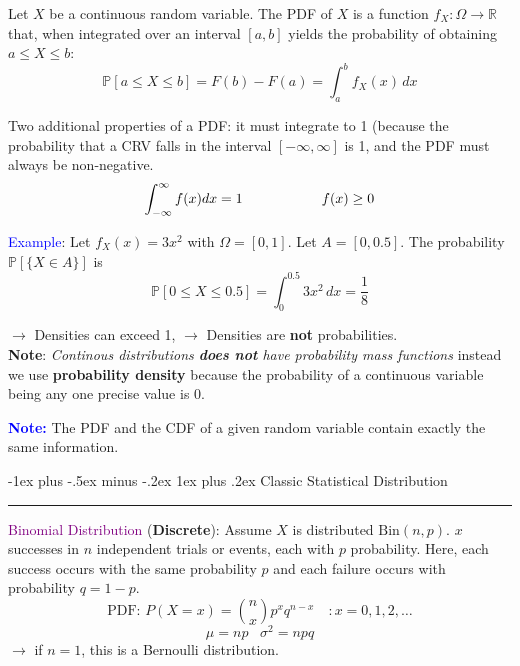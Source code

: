 \documentclass[letterpaper, 10.5pt,landscape]{article}
\makeatletter
\renewcommand{\subsubsection}{\@startsection{subsubsection}{3}{0mm}%
                                {-1ex plus -.5ex minus -.2ex}%
                                {1ex plus .2ex}%
                                {\normalfont\small\bfseries}}
\makeatother
\begin{document}
\begin{multicols*}{3}
   
Let $X$ be a continuous random variable. The  PDF of $X$ is a function \(f_{X}: \Omega \rightarrow \mathbb{R}\) that, when integrated over an interval $[a,b]$ yields the probability of obtaining $a \leq X \leq b:$
\[\boxed{\mathbb{P}[a\leq X \leq b] = F(b) - F(a) = \int_{a}^{b} f_{X}(x) \hspace{2pt} dx} \]



Two additional properties of a PDF:  it must integrate to 1 (because the probability that a CRV falls in the interval $[-\infty, \infty]$ is 1, and the PDF must always be non-negative.
\[\int^\infty_{-\infty}f(x)dx = 1 \hspace{2 cm} f(x) \geq 0\]



\textcolor{blue}{Example}: Let $f_{X}(x) = 3x^{2}$ with $\Omega = [0,1]$. Let $A=[0,0.5]$. The probability $\mathbb{P}[\{X \in A \}]$ is 
\vspace{-3pt}
\[\mathbb{P}[0 \leq X \leq 0.5] = \int_{0}^{0.5} 3x^{2} \hspace{2pt} dx = \frac{1}{8}\]




$\rightarrow$ Densities can exceed 1, $\rightarrow$ Densities are \textbf{not} probabilities. \\

\textbf{Note}: \textit{Continous distributions \textbf{does not} have probability mass functions} instead we use \textbf{probability density} because the probability of a continuous variable being any one precise value is 0.

\textbf{\textcolor{blue}{Note:} } The PDF and the CDF of a given random variable contain exactly the same information.









\subsubsection{Classic Statistical Distribution}{\color{teal}\hrule height 0.5pt} \smallskip
\vspace{-3pt}
\textcolor{purple}{Binomial Distribution} (\textbf{Discrete}): Assume $X$ is distributed \(\text{Bin}(n,p) \). $x$ successes in $n$ independent trials or events, each with $p$ probability. Here, each success occurs with the same probability $p$ and each failure occurs with probability $q=1-p$.
\vspace{-3pt}
\[\boxed{\text{PDF: } P(X=x) =  \binom{n}{x}  p^x q^{n-x} \quad : x = 0,1,2,\ldots }\]
\vspace{-5pt}
\[\boxed{\mu = np} \hspace{10pt} \boxed{\sigma^{2} = npq}\]
$\rightarrow$ if $n=1$, this is a Bernoulli distribution.


\end{multicols*}
\end{document}
